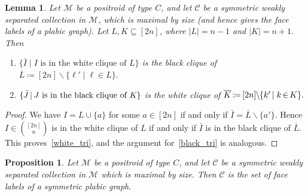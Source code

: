 \documentclass[10pt]{amsart}
\newtheorem{lemm}[theo]{Lemma}
\newtheorem{prop}[theo]{Proposition}
\theoremstyle{definition}
\newcommand*{\mk}{\mkern -1mu}
\newcommand*{\Mk}{\mkern -2mu}
\begin{document}
\begin{lemm}
\label{reflect_clique}
Let $\mathcal{M}$ be a positroid of type $C$, and let $\mathcal{C}$ be a symmetric weakly separated collection in $\mathcal{M}$, which is maximal by size (and hence gives the face labels of a plabic graph).
Let $L, K \subseteq [2n]$, where $|L| = n-1$ and $|K| = n+1$.
Then
\begin{enumerate}
\item \label{white_tri}
$\{\bar{I} \mid I \text{ is in the white clique of $L$}\}$
is the black clique of 
$\overline{L} \coloneqq [2n] \backslash \{\ell' \mid \ell \in L\}.$
\item \label{black_tri}
$\{\mk \bar{J} \Mk \mid \Mk J \text{ is in the black clique of $K$}\mk\}$
is the white clique of $
\overline{K} \Mk \coloneqq \Mk [2n] \mk \backslash \mk \{k' \Mk \mid k \Mk \in \Mk K\}.$
\end{enumerate}
\end{lemm}

\begin{proof}
We have $I = L \cup \{a\}$ for some $a \in [2n]$
if and only if $\bar{I} = \overline{L} \backslash \{a'\}.$
Hence $I \in \binom{[2n]}{n}$ is in the white clique of $L$ if and only if $\bar{I}$ is in the black clique of $\overline{L}$.
This proves~\eqref{white_tri}, and the argument for~\eqref{black_tri} is analogous. \end{proof}

\begin{prop}
\label{goodtiling}
Let $\mathcal{M}$ be a positroid of type $C$, and let $\mathcal{C}$ be a symmetric weakly separated collection in $\mathcal{M}$ which is maximal by size. Then $\mathcal{C}$ is the set of face labels of a symmetric plabic graph. 
\end{prop}
\end{document}

